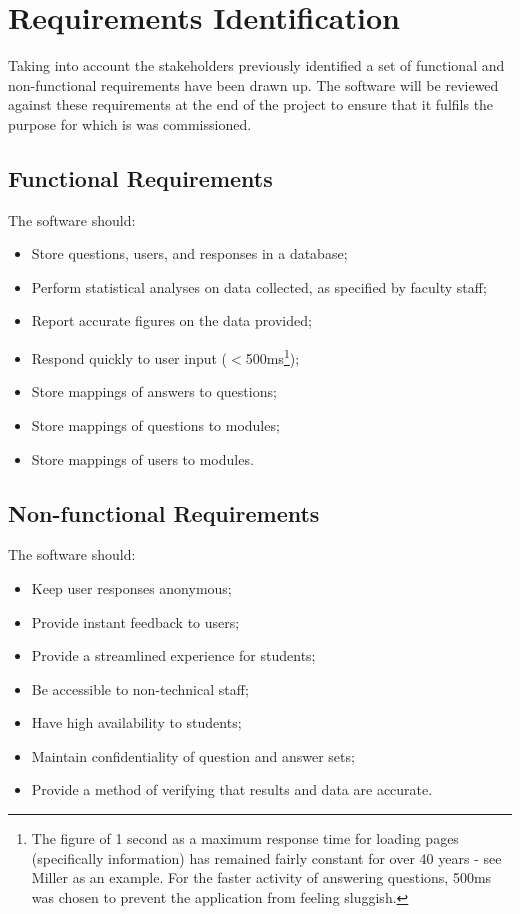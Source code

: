 \documentclass[12pt,a4paper,twoside]{report}
\begin{document}
\section{Requirements Identification}
Taking into account the stakeholders previously identified a set of functional and non-functional requirements have been drawn up. The software will be reviewed against these requirements at the end of the project to ensure that it fulfils the purpose for which is was commissioned.

\subsection{Functional Requirements}
The software should:
\begin{itemize}
	\item Store questions, users, and responses in a database;
	\item Perform statistical analyses on data collected, as specified by faculty staff;
	\item Report accurate figures on the data provided;
	\item Respond quickly to user input ($<$500ms\footnote{The figure of 1 second as a maximum response time for loading pages (specifically information) has remained fairly constant for over 40 years - see Miller \cite{miller1968response} as an example. For the faster activity of answering questions, 500ms was chosen to prevent the application from feeling sluggish.});
	\item Store mappings of answers to questions;
	\item Store mappings of questions to modules;
	\item Store mappings of users to modules.
\end{itemize}
\subsection{Non-functional Requirements}
The software should:
\begin{itemize}
	\item Keep user responses anonymous;
	\item Provide instant feedback to users;
	\item Provide a streamlined experience for students;
	\item Be accessible to non-technical staff;
	\item Have high availability to students;
	\item Maintain confidentiality of question and answer sets;
	\item Provide a method of verifying that results and data are accurate.
\end{itemize}
\end{document}
